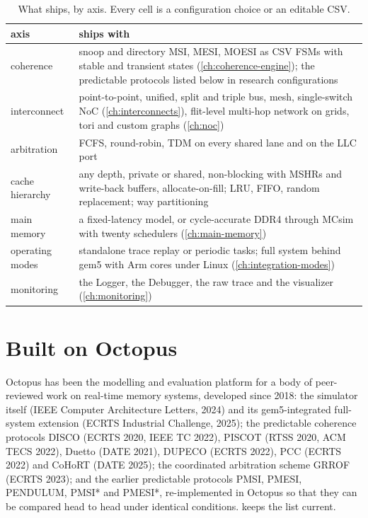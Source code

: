 \begin{table}[htbp]\centering\small
\caption{What ships, by axis. Every cell is a configuration choice or an editable CSV.}\label{tab:features}
\begin{tabularx}{\textwidth}{@{}lY@{}}
\toprule axis & ships with \\ \midrule
coherence & snoop and directory MSI, MESI, MOESI as CSV FSMs with stable and transient states (\cref{ch:coherence-engine}); the predictable protocols listed below in research configurations \\
interconnect & point-to-point, unified, split and triple bus, mesh, single-switch NoC (\cref{ch:interconnects}), flit-level multi-hop network on grids, tori and custom graphs (\cref{ch:noc}) \\
arbitration & FCFS, round-robin, TDM on every shared lane and on the LLC port \\
cache hierarchy & any depth, private or shared, non-blocking with MSHRs and write-back buffers, allocate-on-fill; LRU, FIFO, random replacement; way partitioning \\
main memory & a fixed-latency model, or cycle-accurate DDR4 through MCsim with twenty schedulers (\cref{ch:main-memory}) \\
operating modes & standalone trace replay or periodic tasks; full system behind gem5 with Arm cores under Linux (\cref{ch:integration-modes}) \\
monitoring & the Logger, the Debugger, the raw trace and the visualizer (\cref{ch:monitoring}) \\
\bottomrule
\end{tabularx}
\end{table}

\section{Built on Octopus}

Octopus has been the modelling and evaluation platform for a body of peer-reviewed work on
real-time memory systems, developed since 2018: the simulator itself (IEEE Computer Architecture
Letters, 2024) and its gem5-integrated full-system extension (ECRTS Industrial Challenge, 2025);
the predictable coherence protocols DISCO (ECRTS 2020, IEEE TC 2022), PISCOT (RTSS 2020, ACM
TECS 2022), Duetto (DATE 2021), DUPECO (ECRTS 2022), PCC (ECRTS 2022) and CoHoRT (DATE 2025);
the coordinated arbitration scheme GRROF (ECRTS 2023); and the earlier predictable protocols
PMSI, PMESI, PENDULUM, PMSI* and PMESI*, re-implemented in Octopus so that they can be compared
head to head under identical conditions.  keeps the list current.

